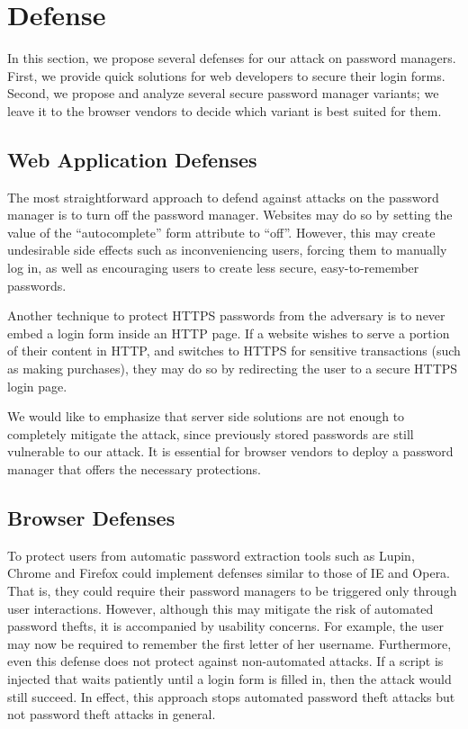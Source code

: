\documentclass[letterpaper,twocolumn,10pt]{article}
\begin{document}
 
\section{Defense}
\label{sec:defense}
In this section, we propose several defenses for our attack on 
password managers. First, we provide quick solutions for web 
developers to secure their login forms. Second, we propose and analyze 
several secure password manager variants; we leave it to the browser 
vendors to decide which variant is best suited for them.

\subsection{Web Application Defenses}
The most straightforward approach to defend against attacks on the 
password manager is to turn off the password manager. Websites may do 
so by setting the value of the ``autocomplete'' form attribute to  
``off''. However, this may create undesirable side effects such as 
inconveniencing users, forcing them to manually log in, as well as 
encouraging users to create less secure, easy-to-remember passwords. 

Another technique to protect HTTPS passwords from the adversary is to 
never embed a login form inside an HTTP page. If a website wishes to 
serve a portion of their content in HTTP, and switches to HTTPS for 
sensitive transactions (such as making purchases), they may do so by 
redirecting the user to a secure HTTPS login page. 

We would like to emphasize that server side solutions are not enough 
to completely mitigate the attack, since previously stored passwords 
are still vulnerable to our attack. It is essential for browser 
vendors to deploy a password manager that offers the necessary 
protections.


\subsection{Browser Defenses}

To protect users from automatic password extraction tools such as 
Lupin, Chrome and Firefox could implement defenses similar to those 
of IE and Opera. That is, they could require their password managers to be 
triggered only through user interactions. However, although this may 
mitigate the risk of automated password thefts, it is accompanied by 
usability concerns. For example, the user may now be required to 
remember the first letter of her username. Furthermore, even this 
defense does not protect against non-automated attacks. If a script is 
injected that waits patiently until a login form is filled in, then 
the attack would still succeed. In effect, this approach stops 
automated password theft attacks but not password theft attacks in 
general. 
\end{document}
